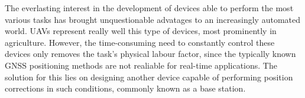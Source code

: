 






The everlasting interest in the development of devices able to perform the most various tasks has brought unquestionable advatages to an increasingly automated world. UAVs represent really well this type of devices, most prominently in agriculture. However, the time-consuming need to constantly control these devices only removes the task's physical labour factor, since the typically known GNSS positioning methods are not realiable for real-time applications. The solution for this lies on designing another device capable of performing position corrections in such conditions, commonly known as a base station.

